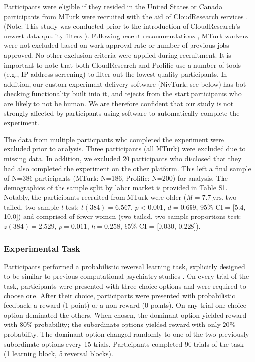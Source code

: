 \documentclass[a4paper,notitlepage,12pt]{article}
\begin{document}
Participants were eligible if they resided in the United States or Canada; participants from MTurk were recruited with the aid of CloudResearch services \cite{litman2017turkprime}. (Note: This study was conducted prior to the introduction of CloudResearch's newest data quality filters \cite{cloudresearch_2020}). Following recent recommendations \cite{robinson2019tapped}, MTurk workers were not excluded based on work approval rate or number of previous jobs approved. No other exclusion criteria were applied during recruitment. It is important to note that both CloudResearch and Prolific use a number of tools (e.g., IP-address screening) to filter out the lowest quality participants. In addition, our custom experiment delivery software (NivTurk; see below) has bot-checking functionality built into it, and rejects from the start participants who are likely to not be human. We are therefore confident that our study is not strongly affected by participants using software to automatically complete the experiment.

The data from multiple participants who completed the experiment were excluded prior to analysis. Three participants (all MTurk) were excluded due to missing data. In addition, we excluded 20 participants who disclosed that they had also completed the experiment on the other platform. This left a final sample of N=386 participants (MTurk: N=186, Prolific: N=200) for analysis. The demographics of the sample split by labor market is provided in Table S1. Notably, the participants recruited from MTurk were older ($M = 7.7 \ \text{yrs}$, two-tailed, two-sample $t$-test: $t(384)=6.567$, $p<0.001$, $d=0.669$, 95\% CI = [5.4, 10.0]) and comprised of fewer women (two-tailed, two-sample proportions test: $z(384)=2.529$, $p=0.011$, $h=0.258$, 95\% CI = [0.030, 0.228]). 

\subsubsection*{Experimental Task}

Participants performed a probabilistic reversal learning task, explicitly designed to be similar to previous computational psychiatry studies \cite{waltz2007probabilistic, mukherjee_reward_2020}. On every trial of the task, participants were presented with three choice options and were required to choose one. After their choice, participants were presented with probabilistic feedback: a reward (1 point) or a non-reward (0 points). On any trial one choice option dominated the others. When chosen, the dominant option yielded reward with 80\% probability; the subordinate options yielded reward with only 20\% probability. The dominant option changed randomly to one of the two previously subordinate options every 15 trials. Participants completed 90 trials of the task (1 learning block, 5 reversal blocks). 
\end{document}
